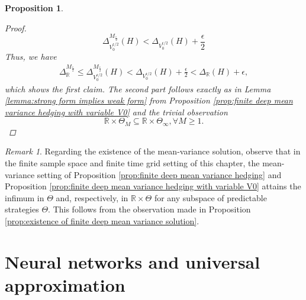 \documentclass[11pt,a4paper,twoside,openany]{report}
\numberwithin{equation}{section}
\theoremstyle{plain} %
\newtheorem{proposition}[theorem]{Proposition}
\theoremstyle{definition} %
\theoremstyle{remark} %
\newtheorem{remark}[theorem]{Remark}
\begin{document}
\begin{proposition}
\begin{proof}
        \begin{equation*}
           \Delta^{M_{\frac{\epsilon}{2}}}_{V_0^{\epsilon/2}}(H)< \Delta_{V_0^{\epsilon/2}}(H)+\frac{\epsilon}{2}
        \end{equation*}
Thus, we have
        \begin{align*}
            \Delta^{M_{\frac{\epsilon}{2}}}_{\mathbb{R}}\leq\Delta^{M_{\frac{\epsilon}{2}}}_{V_0^{\epsilon/2}}(H)<\Delta_{V_0^{\epsilon/2}}(H)+\frac{\epsilon}{2}<\Delta_{\mathbb{R}}(H)+\epsilon,
        \end{align*}
which shows the first claim. The second part follows exactly as in Lemma \ref{lemma:strong form implies weak form} from Proposition \ref{prop:finite deep mean variance hedging with variable V0} and the trivial observation
        \begin{equation*}
        \mathbb{R}\times\Theta_M\subseteq \mathbb{R}\times\Theta_{\infty},\forall M\geq 1.
        \end{equation*}
        \end{proof}
\end{proposition}
\begin{remark}
 Regarding the existence of the mean-variance solution, observe that in the finite sample space and finite time grid setting of this chapter, the mean-variance setting of Proposition \ref{prop:finite deep mean variance hedging} and Proposition \ref{prop:finite deep mean variance hedging with variable V0} attains the infimum in \(\Theta\) and, respectively, in \(\mathbb{R}\times\Theta\) for any subspace of predictable strategies \(\Theta\). This follows from the observation made in Proposition \ref{prop:existence of finite deep mean variance solution}.
\end{remark}

\chapter{Neural networks and universal approximation}\label{ch:Neural Networks and Universal Approximation}
\end{document}

